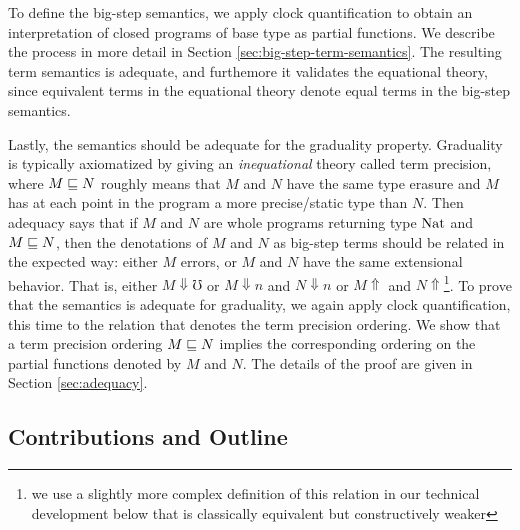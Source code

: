 To define the big-step semantics, we apply clock quantification to obtain
an interpretation of closed programs of base type as partial functions.
We describe the process in more detail in Section
\ref{sec:big-step-term-semantics}. The resulting term semantics is adequate, and
furthemore it validates the equational theory, since equivalent terms in the
equational theory denote equal terms in the big-step semantics.

Lastly, the semantics should be adequate for the graduality property. Graduality
is typically axiomatized by giving an \emph{inequational} theory called term
precision, where $M \sqsubseteq N$ roughly means that $M$ and $N$ have the same type
erasure and $M$ has at each point in the program a more precise/static type than
$N$. Then adequacy says that if $M$ and $N$ are whole programs returning type
$\text{Nat}$ and $M \sqsubseteq N$, then the denotations of $M$ and $N$ as big-step terms
should be related in the expected way: either $M$ errors, or $M$ and $N$ have
the same extensional behavior. That is, either $M\Downarrow \mho$ or $M
\Downarrow n $ and $N \Downarrow n$ or $M \Uparrow $ and $N
\Uparrow$\footnote{we use a slightly more complex definition of this relation in
our technical development below that is classically equivalent but
constructively weaker}.
%
To prove that the semantics is adequate for graduality, we again apply clock
quantification, this time to the relation that denotes the term precision
ordering. We show that a term precision ordering $M \sqsubseteq N$ implies the
corresponding ordering on the partial functions denoted by $M$ and $N$. The
details of the proof are given in Section \ref{sec:adequacy}.





\subsection{Contributions and Outline}

